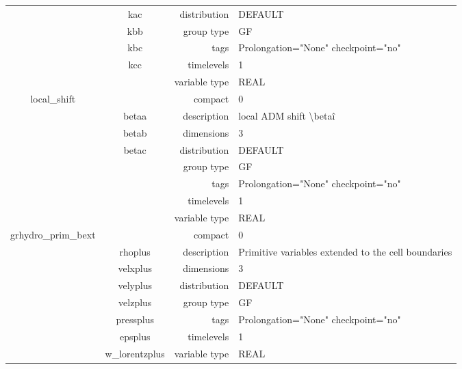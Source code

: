 \begin{tabular*}{150mm}{|c|c@{\extracolsep{\fill}}|rl|}
 & kac & distribution & DEFAULT \\ 
 & kbb & group type & GF \\ 
 & kbc & tags & Prolongation="None" checkpoint="no" \\ 
 & kcc & timelevels & 1 \\ 
 &  & variable type & REAL \\ 
\hline 
local\_shift &  & compact & 0 \\ 
 & betaa & description & local ADM shift {\textbackslash}beta\^i \\ 
 & betab & dimensions & 3 \\ 
 & betac & distribution & DEFAULT \\ 
 &  & group type & GF \\ 
 &  & tags & Prolongation="None" checkpoint="no" \\ 
 &  & timelevels & 1 \\ 
 &  & variable type & REAL \\ 
\hline 
grhydro\_prim\_bext &  & compact & 0 \\ 
 & rhoplus & description & Primitive variables extended to the cell boundaries \\ 
 & velxplus & dimensions & 3 \\ 
 & velyplus & distribution & DEFAULT \\ 
 & velzplus & group type & GF \\ 
 & pressplus & tags & Prolongation="None" checkpoint="no" \\ 
 & epsplus & timelevels & 1 \\ 
 & w\_lorentzplus & variable type & REAL \\ 
\hline 
\end{tabular*} 



\vspace{5mm}
\vspace{5mm}


